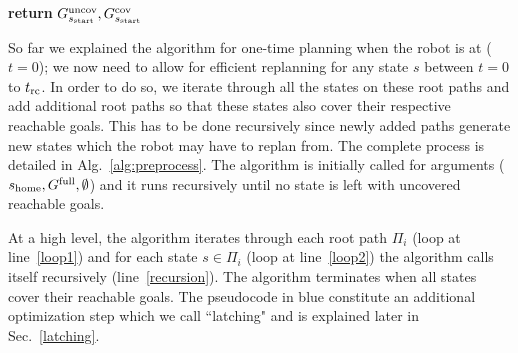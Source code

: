 \documentclass[conference]{IEEEtran}
\begin{document}
\begin{algorithm}[t]
\begin{algorithmic}[1]
 	\EndFor
\EndFor
\EndIf
\State \textbf{return} $G^{\textrm{uncov}}_{s_{\textrm{start}}}, G^{\textrm{cov}}_{s_{\textrm{start}}}$
\EndProcedure
\end{algorithmic}
\end{algorithm}

%


So far we explained the algorithm for one-time planning when the robot is at \Shome ($t = 0$); we now need to allow for efficient replanning for any state $s$ between $t = 0$ to $t_{\textrm{rc}}$. In order to do so, we iterate through all the states on these root paths and add additional root paths so that these states also cover their respective reachable goals. This has to be done recursively since newly added paths generate new states which the robot may have to replan from. The complete process is detailed in Alg.~\ref{alg:preprocess}. The algorithm is initially called for arguments ($s_{\textrm{home}}, G^{\textrm{full}}, \emptyset$) and it runs recursively until no state is left with uncovered reachable goals.
%

At a high level, the algorithm iterates through each root path $\Pi_i$ (loop at line~\ref{loop1}) and for each state $s \in \Pi_i$ (loop at line~\ref{loop2}) the algorithm calls itself recursively (line~\ref{recursion}). The algorithm terminates when all states cover their reachable goals. The pseudocode in blue constitute an additional optimization step which we call ``latching" and is explained later in Sec.~\ref{latching}.
%
\end{document}
